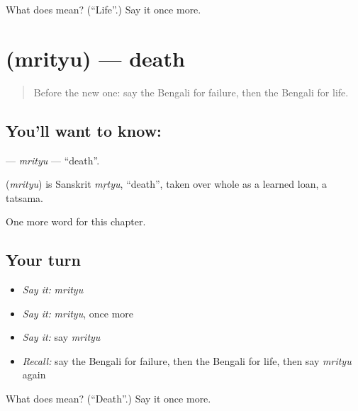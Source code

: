 \begin{tcolorbox}[breakable,colback=teal!4,colframe=teal!35!black,title={Before you move on}]
What does  mean? (\textquotedblleft{}Life\textquotedblright{}.) Say it once more.
\end{tcolorbox}
\section[\texorpdfstring{\bn{মৃত্যু} (mrityu)}{মৃত্যু (mrityu)}]{ (mrityu) — death}

\label{lesson:BN-C228-mrityu}



\begin{quote}
Before the new one: say the Bengali for failure, then the Bengali for life.
\end{quote}

\subsection*{You'll want to know: }
\textbf{} — \emph{mrityu} — \textquotedblleft{}death\textquotedblright{}.

\begin{cousinweb}
\textbf{} (\emph{mrityu}) is Sanskrit \emph{mṛtyu}, \textquotedblleft{}death\textquotedblright{}, taken over whole as a learned loan, a tatsama.
\end{cousinweb}

\begin{grammarlens}[title={What you've built}]
One more word for this chapter.
\end{grammarlens}

\subsection*{Your turn}
\begin{itemize}
\raggedright
  \item \emph{Say it:} \emph{mrityu}
  \item \emph{Say it:} \emph{mrityu}, once more
  \item \emph{Say it:} say \emph{mrityu}
  \item \emph{Recall:} say the Bengali for failure, then the Bengali for life, then say \emph{mrityu} again
\end{itemize}

\begin{tcolorbox}[breakable,colback=teal!4,colframe=teal!35!black,title={Before you move on}]
What does  mean? (\textquotedblleft{}Death\textquotedblright{}.) Say it once more.
\end{tcolorbox}
